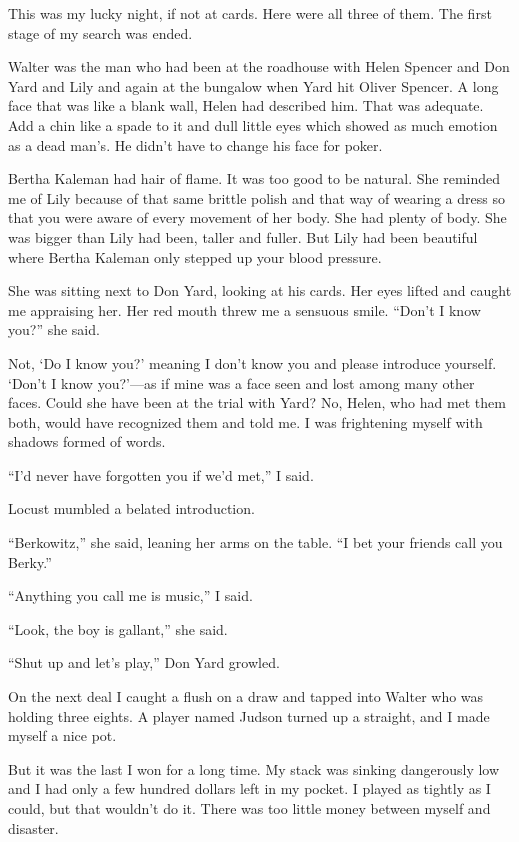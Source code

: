 \documentclass{novel}
\begin{document}
This was my lucky night, if not at cards. Here were all three of them. The first stage of my search was ended.

Walter was the man who had been at the roadhouse with Helen Spencer and Don Yard and Lily and again at the bungalow when Yard hit Oliver Spencer. A long face that was like a blank wall, Helen had described him. That was adequate. Add a chin like a spade to it and dull little eyes which showed as much emotion as a dead man’s. He didn’t have to change his face for poker.

\scenestars

Bertha Kaleman had hair of flame. It was too good to be natural. She reminded me of Lily because of that same brittle polish and that way of wearing a dress so that you were aware of every movement of her body. She had plenty of body. She was bigger than Lily had been, taller and fuller. But Lily had been beautiful where Bertha Kaleman only stepped up your blood pressure.

She was sitting next to Don Yard, looking at his cards. Her eyes lifted and caught me appraising her. Her red mouth threw me a sensuous smile. “Don’t I know you?” she said.

Not, ‘Do I know you?’ meaning I don’t know you and please introduce yourself. ‘Don’t I know you?’—as if mine was a face seen and lost among many other faces. Could she have been at the trial with Yard? No, Helen, who had met them both, would have recognized them and told me. I was frightening myself with shadows formed of words.

“I’d never have forgotten you if we’d met,” I said.

Locust mumbled a belated introduction.

“Berkowitz,” she said, leaning her arms on the table. “I bet your friends call you Berky.”

“Anything you call me is music,” I said.

“Look, the boy is gallant,” she said.

“Shut up and let’s play,” Don Yard growled.

On the next deal I caught a flush on a draw and tapped into Walter who was holding three eights. A player named Judson turned up a straight, and I made myself a nice pot.

But it was the last I won for a long time. My stack was sinking dangerously low and I had only a few hundred dollars left in my pocket. I played as tightly as I could, but that wouldn’t do it. There was too little money between myself and disaster.
\end{document}
